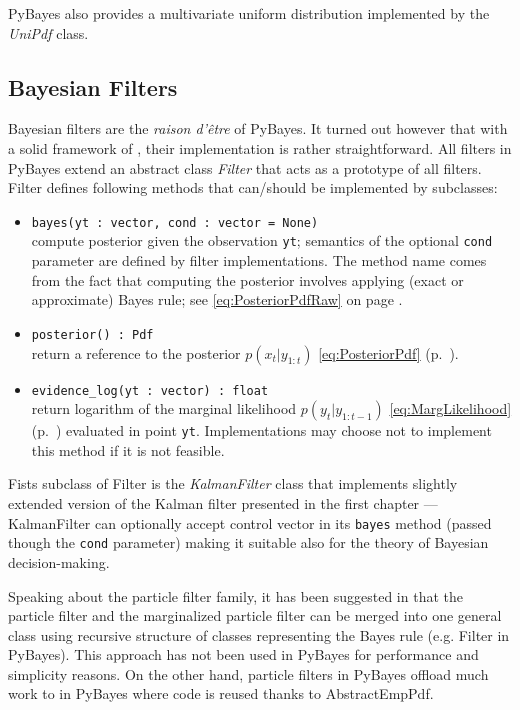PyBayes also provides a multivariate uniform distribution implemented by the \emph{UniPdf} class.

\subsection{Bayesian Filters}

Bayesian filters are the \emph{raison d'être} of PyBayes. It turned out however that with a solid
framework of {\pdfs}, their implementation is rather straightforward. All filters in PyBayes extend
an abstract class \emph{Filter} that acts as a prototype of all filters. Filter defines following
methods that can/should be implemented by subclasses:
\begin{itemize}
	\item \verb|bayes(yt : vector, cond : vector = None)| \\
		compute posterior {\pdf} given
		the observation \verb|yt|; semantics of the optional \verb|cond| parameter are defined
		by filter implementations. The method name comes from the fact that computing the posterior
		{\pdf} involves applying (exact or approximate) Bayes rule; see \eqref{eq:PosteriorPdfRaw}
		on page \pageref{eq:PosteriorPdfRaw}.
	\item \verb|posterior() : Pdf| \\
		return a reference to the posterior {\pdf} \(p(x_t | y_{1:t})\) \eqref{eq:PosteriorPdf}
		(p.~\pageref{eq:PosteriorPdf}).
	\item \verb|evidence_log(yt : vector) : float| \\
		return logarithm of the marginal likelihood \(p(y_t | y_{1:t-1})\) \eqref{eq:MargLikelihood}
		(p.~\pageref{eq:MargLikelihood}) evaluated in point \verb|yt|. Implementations may choose
		not to implement this method if it is not feasible.
\end{itemize}
Fists subclass of Filter is the \emph{KalmanFilter} class that implements slightly extended version
of the Kalman filter presented in the first chapter --- KalmanFilter can optionally accept control
vector in its \verb|bayes| method (passed though the \verb|cond| parameter) making it suitable also
for the theory of Bayesian decision-making.

Speaking about the particle filter family, it has been suggested in \cite{Smi:10} that the particle
filter and the marginalized particle filter can be merged into one general class using recursive
structure of classes representing the Bayes rule (e.g. Filter in PyBayes). This approach has not
been used in PyBayes for performance and simplicity reasons. On the other hand, particle filters in
PyBayes offload much work to {\pdfs} in PyBayes where code is reused thanks to AbstractEmpPdf.

